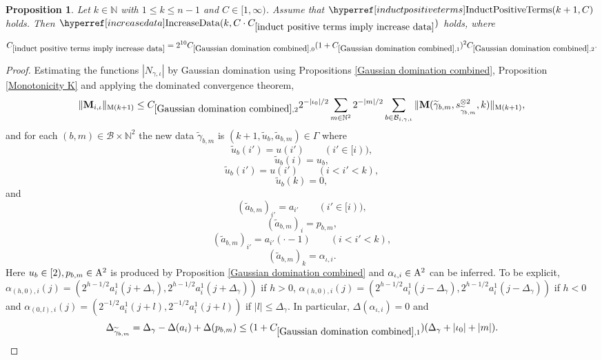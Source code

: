 \documentclass[12pt,reqno]{amsart}
\theoremstyle{plain}
\newtheorem{proposition}[theorem]{Proposition}
\numberwithin{equation}{section}
\theoremstyle{remark}
\newcommand{\using}[1]{}
\newcommand{\N}{{\mathbb N}}
\newcommand{\M}{\mathbf{M}}
\begin{document}
\begin{proposition}
\label{induct positive terms imply increase data}\using{Gaussian domination combined}\using{Monotonicity K}
Let $k\in\N$ with $1\le k\le n-1$ and $C\in [1,\infty)$.
Assume that $\InductPositiveTerms{k+1,C}$ holds. Then $\IncreaseData{k,C\cdot C_{\ref{induct positive terms imply increase data}}}$ holds, where
\begin{equation}\label{auto:increase-data-induction-constant-definition}C_{\ref{induct positive terms imply increase data}} = 2^{10} C_{\ref{Gaussian domination combined},0} (1+C_{\ref{Gaussian domination combined},1})^2 C_{\ref{Gaussian domination combined},2}.\end{equation}
\end{proposition}


\begin{proof}
Estimating the functions $|N_{\gamma,\iota}|$ by Gaussian domination using Propositions \ref{Gaussian domination combined}, Proposition \ref{Monotonicity K} and applying the dominated convergence theorem,
\begin{equation}\label{eqn:increasedatapf1}
\|\M_{i,\iota}\|_{{\rm M}(k+1)} \le C_{\ref{Gaussian domination combined},2} 2^{-|\iota_0|/2} \sum_{m\in\mathbb{N}^2} 2^{-|m|/2} \sum_{b\in\mathcal{B}_{i,\gamma,\iota}} \|\M(\widetilde{\gamma}_{b,m}, s_{\widetilde{\gamma}_{b,m}}^{\otimes 2}  ,k)\|_{{\rm M}(k+1)},
\end{equation}
and for each $(b,m)\in\mathcal{B}\times \mathbb{N}^2$ the new data $\widetilde{\gamma}_{b,m}$ is $(k+1,\widetilde{u}_{b},\widetilde{a}_{b,m})\in \Gamma$ where
\[
\widetilde u_b(i')=u(i')\qquad(i'\in[i)),
\]
\[
\widetilde u_b(i)=u_b,
\]
\[
\widetilde u_b(i')=u(i')\qquad(i<i'<k),
\]
\[
\widetilde u_b(k)=0,
\]
and
\[
(\widetilde a_{b,m})_{i'}=a_{i'}\qquad(i'\in[i)),
\]
\[
(\widetilde a_{b,m})_i=p_{b,m},
\]
\[
(\widetilde a_{b,m})_{i'}=a_{i'}(\cdot-1)\qquad(i<i'<k),
\]
\[
(\widetilde a_{b,m})_k=\alpha_{\iota,i}.
\]
Here $u_b\in [2), p_{b,m}\in {\rm A}^2$ is produced by Proposition \ref{Gaussian domination combined} and
$\alpha_{\iota,i}\in {\rm A}^2$ can be inferred. To be explicit,
$\alpha_{(h,0),i}(j) = (2^{h-1/2} a_i^1(j+\Delta_{\gamma}),2^{h-1/2} a_i^1(j+\Delta_{\gamma}))$ if $h>0$,
$\alpha_{(h,0),i}(j) = (2^{h-1/2} a_i^1(j-\Delta_{\gamma}),2^{h-1/2} a_i^1(j-\Delta_{\gamma}))$ if $h<0$ and
$\alpha_{(0,l),i}(j) = (2^{-1/2} a_i^1(j+l),2^{-1/2} a_i^1(j+l))$ if $|l|\le \Delta_{\gamma}$.
In particular, $\Delta(\alpha_{\iota,i})=0$ and
\[ \Delta_{\widetilde{\gamma}_{b,m}}=\Delta_\gamma-\Delta(a_i)+\Delta(p_{b,m}) \le  (1+C_{\ref{Gaussian domination combined},1})(\Delta_\gamma+|\iota_0|+|m|). \]

\end{proof}
\end{document}
